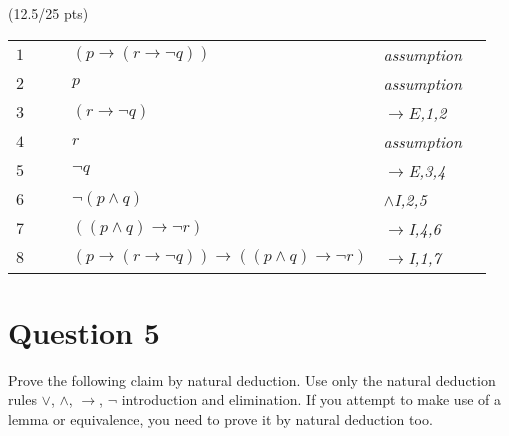 \documentclass[a4paper,12pt]{article}
\newcommand\tab[1][1cm]{\hspace*{#1}}
\begin{document}
\hfill \small{(12.5/25 pts)}\\
\begin{tcolorbox}
\begin{table}[H]
	\centering

	\begin{tabular}{*6{l}}
	\cline{2-6}
		$1$ & \multicolumn{1}{|c}{} & & $(p \rightarrow (r \rightarrow \neg q))$ & \textit{assumption} & \multicolumn{1}{c|}{} \\
		
		$2$ & \multicolumn{1}{|c}{} & &  $p$ & \textit{assumption} & \multicolumn{1}{c|}{} \\
		 
		$3$ & \multicolumn{1}{|c}{} & & $(r \rightarrow \neg q)$ & \textit{$\rightarrow E$,1,2} & \multicolumn{1}{c|}{} \\ \cline{3-5}
		
		$4$ &\multicolumn{1}{|c}{}&\multicolumn{1}{|c}{}& $r $ &\multicolumn{1}{l|}{\textit{assumption}}&\multicolumn{1}{c|}{} \\
		
		$5$ &\multicolumn{1}{|c}{}&\multicolumn{1}{|c}{}& $\neg q $ &\multicolumn{1}{l|}{\textit{ $\rightarrow$E,3,4}}&\multicolumn{1}{c|}{} \\
		
		$6$ &\multicolumn{1}{|c}{} & \multicolumn{1}{|c}{} & $\neg(p \wedge q)$ & \multicolumn{1}{l|}{\textit{$\wedge$I,2,5}} & \multicolumn{1}{c|}{}\\ \cline{3-5}
		
		$7$ & \multicolumn{1}{|c}{} & & $((p \wedge q) \rightarrow \neg r)$ & {\textit{$\rightarrow$I,4,6}} & \multicolumn{1}{c|}{}\\ \cline{2-6}
		
		$8$ & & & $(p \rightarrow (r \rightarrow \neg q)) \rightarrow ((p \wedge q) \rightarrow \neg r)$ & {\textit{$\rightarrow$I,1,7}} &\\ 
	\end{tabular}
\end{table}
\end{tcolorbox}

\newpage


\section*{Question 5 \hfill {}}
\tab Prove the following claim by natural deduction. Use only the natural deduction rules $\vee$, $\wedge$, $\rightarrow$, $\neg$ introduction and elimination. If you attempt to make use of a lemma or equivalence, you need to prove it by natural deduction too.
\end{document}

